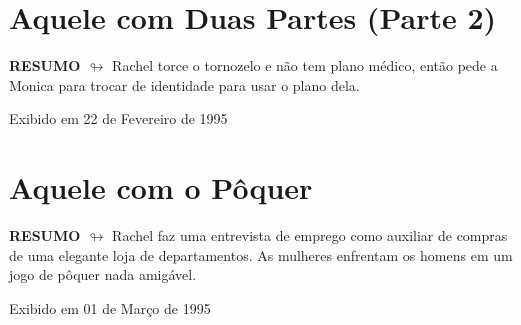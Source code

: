 \chapter{Aquele com Duas Partes (Parte 2)}

\textbf{RESUMO $\looparrowright$} Rachel torce o tornozelo e não tem plano médico, então pede a Monica para trocar de identidade para usar o plano dela.

\begin{flushright}
\textcolor{gray600}{Exibido em 22 de Fevereiro de 1995}
\end{flushright}


\chapter{Aquele com o Pôquer}

\textbf{RESUMO $\looparrowright$} Rachel faz uma entrevista de emprego como auxiliar de compras de uma elegante loja de departamentos. As mulheres enfrentam os homens em um jogo de pôquer nada amigável.

\begin{flushright}
\textcolor{gray600}{Exibido em 01 de Março de 1995}
\end{flushright}


